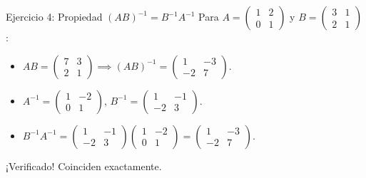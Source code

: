 \documentclass[11pt]{beamer}
\begin{document}
\begin{frame}{Ejercicio 4: Propiedad $(AB)^{-1} = B^{-1} A^{-1}$}
  Para $A = \begin{pmatrix} 1 & 2 \\ 0 & 1 \end{pmatrix}$ y $B = \begin{pmatrix} 3 & 1 \\ 2 & 1 \end{pmatrix}$:
  \begin{itemize}
    \item $AB = \begin{pmatrix} 7 & 3 \\ 2 & 1 \end{pmatrix} \implies (AB)^{-1} = \begin{pmatrix} 1 & -3 \\ -2 & 7 \end{pmatrix}$.
    \item $A^{-1} = \begin{pmatrix} 1 & -2 \\ 0 & 1 \end{pmatrix}$, \quad $B^{-1} = \begin{pmatrix} 1 & -1 \\ -2 & 3 \end{pmatrix}$.
    \item $B^{-1} A^{-1} = \begin{pmatrix} 1 & -1 \\ -2 & 3 \end{pmatrix}\begin{pmatrix} 1 & -2 \\ 0 & 1 \end{pmatrix} = \begin{pmatrix} 1 & -3 \\ -2 & 7 \end{pmatrix}$.
  \end{itemize}
  \vfill
  ¡Verificado! Coinciden exactamente.
\end{frame}
\end{document}
